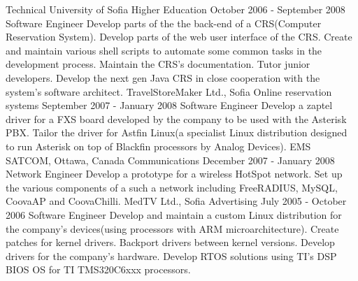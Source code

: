 {
  Technical University of Sofia
}
{
  Higher Education
}
\ecvitem{}{} %
\ecvitem{}{} %
{
  October 2006 - September 2008
}
{
  Software Engineer
}
{
  Develop parts of the the back-end of a CRS(Computer
  Reservation System). Develop parts of the web user interface of the CRS. Create and maintain
  various shell scripts to automate some common tasks in the development process. Maintain the
  CRS's documentation. Tutor junior developers. Develop the next gen Java CRS in close cooperation
  with the system's software architect.
}
{
  TravelStoreMaker Ltd., Sofia
}
{
  Online reservation systems
}
\ecvitem{}{} %
\ecvitem{}{} %
{
  September 2007 - January 2008
}
{
  Software Engineer
}
{
  Develop a zaptel driver for a FXS board developed by
  the company to be used with the Asterisk PBX. Tailor the driver for Astfin Linux(a specialist Linux
  distribution designed to run Asterisk on top of Blackfin processors by Analog Devices).
}
{
  EMS SATCOM, Ottawa, Canada
}
{
  Communications
}
\ecvitem{}{} %
\ecvitem{}{} %
{
  December 2007 - January 2008
}
{
  Network Engineer
}
{
  Develop a prototype for a wireless HotSpot network.
  Set up the various components of a such a network including FreeRADIUS, MySQL, CoovaAP and
  CoovaChilli.
}
{
  MedTV Ltd., Sofia
}
{
  Advertising
}
\ecvitem{}{} %
\ecvitem{}{} %
{
  July 2005 - October 2006
}
{
  Software Engineer
}
{
  Develop and maintain a custom Linux distribution for
  the company's devices(using processors with ARM microarchitecture). Create patches for kernel
  drivers. Backport drivers between kernel versions. Develop drivers for the company's hardware.
  Develop RTOS solutions using TI's DSP BIOS OS for TI TMS320C6xxx processors.
}
